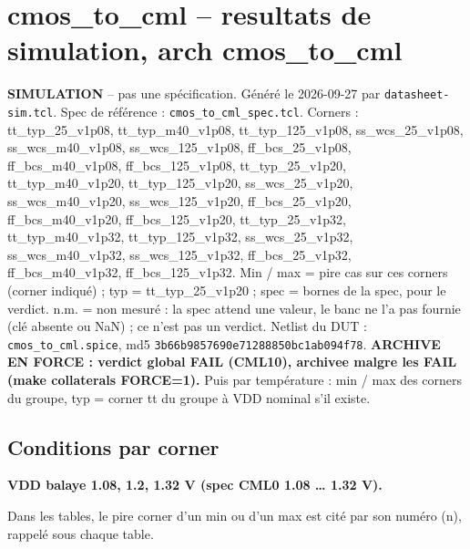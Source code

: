 \documentclass[a4paper,10pt,landscape]{article}
\begin{document}
\section*{cmos\_to\_cml -- resultats de simulation, arch cmos\_to\_cml}
\textbf{SIMULATION} -- pas une sp\'ecification. G\'en\'er\'e le 2026-09-27 par \texttt{datasheet-sim.tcl}.
Spec de r\'ef\'erence : \texttt{cmos\_to\_cml\_spec.tcl}. Corners : tt\_typ\_25\_v1p08, tt\_typ\_m40\_v1p08, tt\_typ\_125\_v1p08, ss\_wcs\_25\_v1p08, ss\_wcs\_m40\_v1p08, ss\_wcs\_125\_v1p08, ff\_bcs\_25\_v1p08, ff\_bcs\_m40\_v1p08, ff\_bcs\_125\_v1p08, tt\_typ\_25\_v1p20, tt\_typ\_m40\_v1p20, tt\_typ\_125\_v1p20, ss\_wcs\_25\_v1p20, ss\_wcs\_m40\_v1p20, ss\_wcs\_125\_v1p20, ff\_bcs\_25\_v1p20, ff\_bcs\_m40\_v1p20, ff\_bcs\_125\_v1p20, tt\_typ\_25\_v1p32, tt\_typ\_m40\_v1p32, tt\_typ\_125\_v1p32, ss\_wcs\_25\_v1p32, ss\_wcs\_m40\_v1p32, ss\_wcs\_125\_v1p32, ff\_bcs\_25\_v1p32, ff\_bcs\_m40\_v1p32, ff\_bcs\_125\_v1p32.
Min / max = pire cas sur ces corners (corner indiqu\'e) ; typ = tt\_typ\_25\_v1p20 ; spec = bornes de la spec, pour le verdict. n.m. = non mesur\'e : la spec attend une valeur, le banc ne l'a pas fournie (cl\'e absente ou NaN) ; ce n'est pas un verdict.
Netlist du DUT : \texttt{cmos\_to\_cml.spice}, md5 \texttt{3b66b9857690e71288850bc1ab094f78}.
\textbf{ARCHIVE EN FORCE : verdict global FAIL (CML10), archivee malgre les FAIL (make collaterals FORCE=1).}
Puis par temp\'erature : min / max des corners du groupe, typ = corner tt du groupe \`a VDD nominal s'il existe.

\subsection*{Conditions par corner}
\textbf{VDD balaye 1.08, 1.2, 1.32 V (spec CML0 1.08 \ldots{} 1.32 V).}

Dans les tables, le pire corner d'un min ou d'un max est cit\'e par son num\'ero (n), rappel\'e sous chaque table.
\end{document}
